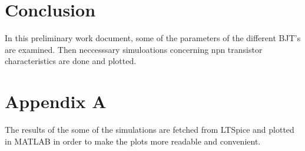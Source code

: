 \documentclass[letterpaper,12pt]{article}
\begin{document}
\section{Conclusion}
In this preliminary work document, some of the parameters of the different BJT's are examined. Then neccesssary simuloations concerning npn transistor characteristics are done and plotted. 

\section*{Appendix A}
The results of the some of the simulations are fetched from LTSpice and plotted in MATLAB in order to make the plots more readable and convenient.
\end{document}
